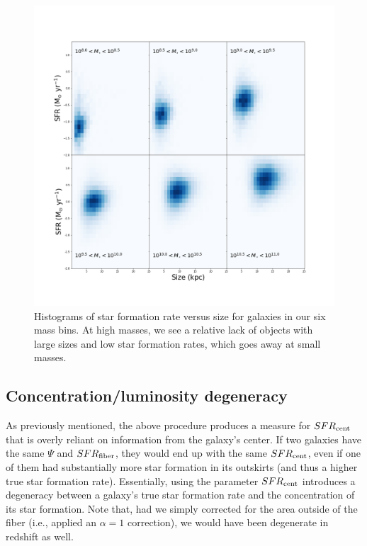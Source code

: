 \documentclass[iop]{emulateapj}
\begin{document}
\begin{figure}
	\centering
	\includegraphics[width=2 \columnwidth]{size_sfr_linear.png}
	\caption{Histograms of star formation rate versus size for galaxies in our six mass bins. At high masses, we see a relative lack of objects with large sizes and low star formation rates, which goes away at small masses.}
	\label{fig:size_sfr}
	
\end{figure}


\subsection{Concentration/luminosity degeneracy}
\label{sec:concdep}
As previously mentioned, the above procedure produces a measure for $SFR_{\rm cent}$ that is overly reliant on information from the galaxy's center. If two galaxies have the same $\Psi$ and $SFR_{\rm fiber}$, they would end up with the same $SFR_{\rm cent}$, even if one of them had substantially more star formation in its outskirts (and thus a higher true star formation rate). Essentially, using the parameter $SFR_{\rm cent}$ introduces a degeneracy between a galaxy's true star formation rate and the concentration of its star formation. Note that, had we simply corrected for the area outside of the fiber (i.e., applied an $\alpha= 1$ correction), we would have been degenerate in redshift as well.
\end{document}
